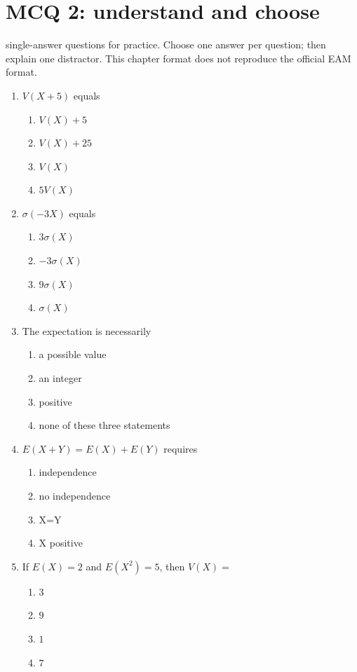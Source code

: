 \endgroup
\begingroup\small
{}\section*{MCQ 2: understand and choose}\label{C08-Q2}
 single-answer questions for practice. Choose one answer per question; then explain one distractor. This chapter format does not reproduce the official EAM format.
\begin{enumerate}
\item $V(X+5)$ equals
\begin{enumerate}[label=\Alph*.,itemsep=2pt]
\item $V(X)+5$
\item $V(X)+25$
\item $V(X)$
\item $5V(X)$
\end{enumerate}
\item $\sigma(-3X)$ equals
\begin{enumerate}[label=\Alph*.,itemsep=2pt]
\item $3\sigma(X)$
\item $-3\sigma(X)$
\item $9\sigma(X)$
\item $\sigma(X)$
\end{enumerate}
\item The expectation is necessarily
\begin{enumerate}[label=\Alph*.,itemsep=2pt]
\item a possible value
\item an integer
\item positive
\item none of these three statements
\end{enumerate}
\item $E(X+Y)=E(X)+E(Y)$ requires
\begin{enumerate}[label=\Alph*.,itemsep=2pt]
\item independence
\item no independence
\item X=Y
\item X positive
\end{enumerate}
\item If $E(X)=2$ and $E(X^2)=5$, then $V(X)=$
\begin{enumerate}[label=\Alph*.,itemsep=2pt]
\item $3$
\item $9$
\item $1$
\item $7$
\end{enumerate}
\end{enumerate}
